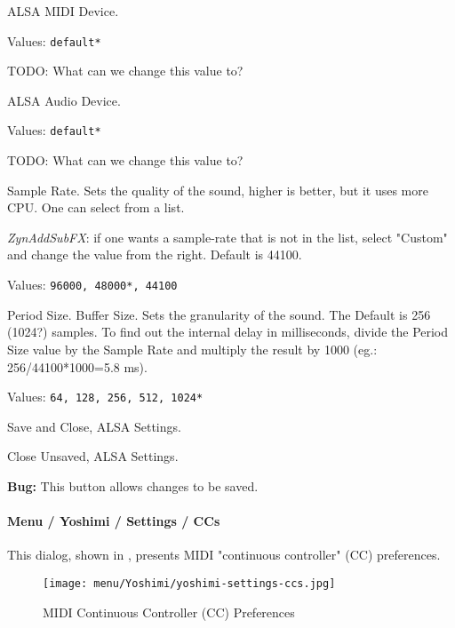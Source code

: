    \setcounter{ItemCounter}{0}      %

   ALSA MIDI Device.

   Values: \texttt{default*}

   TODO: What can we change this value to?

   ALSA Audio Device.

   Values: \texttt{default*}

   TODO: What can we change this value to?

   Sample Rate.
   Sets the quality of the sound, higher is better, but it uses more CPU.
   One can select from a list.
   
   \textsl{ZynAddSubFX}: if one wants a sample-rate that
   is not in the list, select "Custom" and change the value from the right.
   Default is 44100.

   Values: \texttt{96000, 48000*, 44100}

   Period Size.
   Buffer Size.
   Sets the granularity of the sound. The Default is 256 (1024?)
   samples. To find out the internal delay in milliseconds, divide the
   Period Size value by the Sample Rate and multiply the result by 1000
   (eg.: 256/44100*1000=5.8 ms).

   Values: \texttt{64, 128, 256, 512, 1024*}

   Save and Close, ALSA Settings.

   Close Unsaved, ALSA Settings.

   \textbf{Bug:}
   This button allows changes to be saved.

\paragraph{Menu / Yoshimi / Settings / CCs}
\label{paragraph:menu_yoshimi_settings_ccs}

   \setcounter{ItemCounter}{0}      %

   This dialog,
   shown in ,
   presents MIDI "continuous controller" (CC) preferences.

\begin{figure}[H]
   \centering 
   \texttt{[image: menu/Yoshimi/yoshimi-settings-ccs.jpg]}
   \caption[MIDI CC Preferences]{MIDI Continuous Controller (CC) Preferences}
   \label{fig:yoshimi_settings_cc}
\end{figure}

